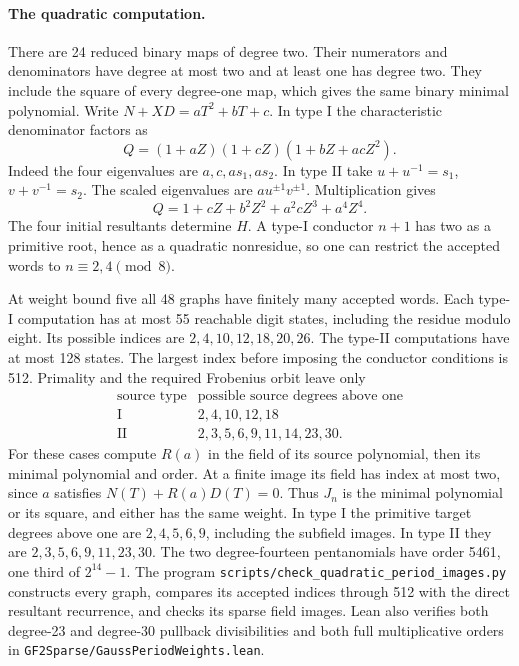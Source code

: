 \documentclass[11pt]{article}
\begin{document}
\paragraph{The quadratic computation.}
There are 24 reduced binary maps of degree two. Their numerators
and denominators have degree at most two and at least one has degree
two. They include the square of every degree-one map, which gives the
same binary minimal polynomial. Write \(N+XD=aT^2+bT+c\). In type I the
characteristic denominator factors as
\[
       Q=(1+aZ)(1+cZ)(1+bZ+acZ^2).
\]
Indeed the four eigenvalues are \(a,c,as_1,as_2\).
In type II take \(u+u^{-1}=s_1\), \(v+v^{-1}=s_2\). The scaled
eigenvalues are \(a u^{\pm1}v^{\pm1}\). Multiplication gives
\[
       Q=1+cZ+b^2Z^2+a^2cZ^3+a^4Z^4 .
\]
The four initial resultants determine \(H\). A type-I conductor
\(n+1\) has two as a primitive root, hence as a quadratic nonresidue,
so one can restrict the accepted words to \(n\equiv2,4\pmod8\).

At weight bound five all 48 graphs have finitely many accepted words.
Each type-I computation has at most 55 reachable digit states, including
the residue modulo eight. Its possible indices are
\(2,4,10,12,18,20,26\). The type-II computations have at most 128 states.
The largest index before imposing the conductor conditions is 512.
Primality and the required Frobenius orbit leave only
\[
\begin{array}{l|l}
\text{source type}&\text{possible source degrees above one}\\ \hline
\mathrm I& 2,4,10,12,18\\
\mathrm {II}& 2,3,5,6,9,11,14,23,30.
\end{array}
\]
For these cases compute \(R(a)\) in the field of its source polynomial,
then its minimal polynomial and order. At a finite image its field has
index at most two, since \(a\) satisfies \(N(T)+R(a)D(T)=0\).
Thus \(J_n\) is the minimal polynomial or its square, and either has
the same weight. In type I the primitive target degrees above one are
\(2,4,5,6,9\), including the subfield images. In type II they are
\(2,3,5,6,9,11,23,30\). The two degree-fourteen pentanomials have
order 5461, one third of \(2^{14}-1\).
The program \nolinkurl{scripts/check_quadratic_period_images.py}
constructs every graph, compares its accepted indices through 512 with
the direct resultant recurrence, and checks its sparse field images.
Lean also verifies both degree-23 and degree-30 pullback divisibilities
and both full multiplicative orders in
\nolinkurl{GF2Sparse/GaussPeriodWeights.lean}.
\end{document}
